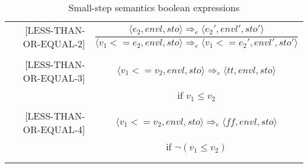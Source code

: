 \begin{longtable}[c] { r c }
  [LESS-THAN-OR-EQUAL-2] & \( 
    \dfrac { \langle e_2, envl, sto \rangle \Rightarrow_e \langle e_2', envl', sto' \rangle }
      { \langle v_1 < = e_2, envl, sto \rangle \Rightarrow_e \langle v_1 < = e_2', envl', sto' \rangle } \)
  \\
  & \\

  [LESS-THAN-OR-EQUAL-3] & \( 
    \langle v_1 < = v_2, envl, sto \rangle \Rightarrow_e \langle tt, envl, sto \rangle \)
  \\
  & if \( v_1 \leq v_2 \) \\
  & \\

  [LESS-THAN-OR-EQUAL-4] & \( 
    \langle v_1 < = v_2, envl, sto \rangle \Rightarrow_e \langle ff, envl, sto \rangle \)
  \\
  & if \( \neg(v_1 \leq v_2) \) \\
  & \\
  \caption{Small-step semantics boolean expressions}
\end{longtable}